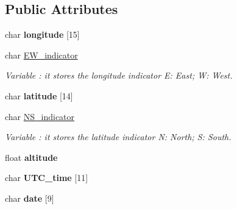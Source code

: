 \subsection*{Public Attributes}
\begin{DoxyCompactItemize}
\item 
char {\bfseries longitude} \mbox{[}15\mbox{]}\hypertarget{class_wasp_g_p_r_s___s_i_m908_ae3618c407f7a48b98710ed8b91e211b1}{}\label{class_wasp_g_p_r_s___s_i_m908_ae3618c407f7a48b98710ed8b91e211b1}

\item 
char \hyperlink{class_wasp_g_p_r_s___s_i_m908_a873b39ca04434005b9dd57acd8686f9f}{E\+W\+\_\+indicator}\hypertarget{class_wasp_g_p_r_s___s_i_m908_a873b39ca04434005b9dd57acd8686f9f}{}\label{class_wasp_g_p_r_s___s_i_m908_a873b39ca04434005b9dd57acd8686f9f}

\begin{DoxyCompactList}\small\item\em Variable \+: it stores the longitude indicator E\+: East; W\+: West. \end{DoxyCompactList}\item 
char {\bfseries latitude} \mbox{[}14\mbox{]}\hypertarget{class_wasp_g_p_r_s___s_i_m908_ae7638583d588eee6362b965427be3259}{}\label{class_wasp_g_p_r_s___s_i_m908_ae7638583d588eee6362b965427be3259}

\item 
char \hyperlink{class_wasp_g_p_r_s___s_i_m908_af9a76e59b80ca5b9f8d5cddac423b776}{N\+S\+\_\+indicator}\hypertarget{class_wasp_g_p_r_s___s_i_m908_af9a76e59b80ca5b9f8d5cddac423b776}{}\label{class_wasp_g_p_r_s___s_i_m908_af9a76e59b80ca5b9f8d5cddac423b776}

\begin{DoxyCompactList}\small\item\em Variable \+: it stores the latitude indicator N\+: North; S\+: South. \end{DoxyCompactList}\item 
float {\bfseries altitude}\hypertarget{class_wasp_g_p_r_s___s_i_m908_aa4d41b6bb340db0235df661ae3d503c1}{}\label{class_wasp_g_p_r_s___s_i_m908_aa4d41b6bb340db0235df661ae3d503c1}

\item 
char {\bfseries U\+T\+C\+\_\+time} \mbox{[}11\mbox{]}\hypertarget{class_wasp_g_p_r_s___s_i_m908_a8837503ca53d19ab651524ad3970be5e}{}\label{class_wasp_g_p_r_s___s_i_m908_a8837503ca53d19ab651524ad3970be5e}

\item 
char {\bfseries date} \mbox{[}9\mbox{]}\hypertarget{class_wasp_g_p_r_s___s_i_m908_a99c94511a6a8bf44e08e682d7f3c3a35}{}\label{class_wasp_g_p_r_s___s_i_m908_a99c94511a6a8bf44e08e682d7f3c3a35}


\end{DoxyCompactItemize}
